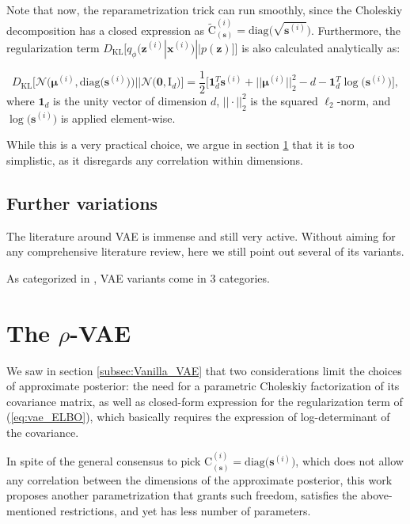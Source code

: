 \documentclass{article}
\begin{document}
Note that now, the reparametrization trick can run smoothly, since the Choleskiy decomposition has a closed expression as $\tilde{\mathrm{C}}_{(\mathbf{s})}^{(i)} = \text{diag} \big( \sqrt{\mathbf{s}^{(i)}} \big) $. Furthermore, the regularization term $D_{\text{KL}}\big[ q_{\phi}(\mathbf{z}^{(i)}  | \mathbf{x}^{(i)}) || p(\mathbf{z}) \big] \Big]$ is also calculated analytically as:

\begin{equation}  \label{eq:vae_KLD_loss}
D_{\text{KL}}\Big[ \mathcal{N} \Big( \boldsymbol{\mu}^{(i)}, \text{diag} \big( \mathbf{s}^{(i)} \big) \Big)    \Big|\Big|  \mathcal{N} \big( \mathbf{0}, \mathrm{I}_d \big)  \Big] = \frac{1}{2} \Big[ \mathbf{1}_d^T \mathbf{s}^{(i)} + \big|\big| \boldsymbol{\mu}^{(i)} \big|\big|_2^2 -d -  \mathbf{1}_d^T \log \big({\mathbf{s}^{(i)}} \big) \Big], 
\end{equation}
where $\mathbf{1}_d$ is the unity vector of dimension $d$, $||\cdot||_2^2$ is the squared $\ell_2$-norm, and $\log \big({\mathbf{s}^{(i)}} \big)$ is applied element-wise.

While this is a very practical choice, we argue in section \ref{sec:proposed} that it is too simplistic, as it disregards any correlation within dimensions.


\subsection{Further variations} \label{subsec:SOTA}
The literature around VAE is immense and still very active. Without aiming for any comprehensive literature review, here we still point out several of its variants.

As categorized in \cite{tschannen2018recent}, VAE variants come in 3 categories.
 
\section{The $\rho$-VAE}  \label{sec:proposed}
We saw in section \ref{subsec:Vanilla_VAE} that two considerations limit the choices of approximate posterior: the need for a parametric Choleskiy factorization of its covariance matrix, as well as closed-form expression for the regularization term of (\ref{eq:vae_ELBO}), which basically requires the expression of log-determinant  of the covariance.

In spite of the general consensus to pick $\mathrm{C}_{(\mathbf{s})}^{(i)} = \text{diag}\big( \mathbf{s}^{(i)} \big)$, which does not allow any correlation between the dimensions of the approximate posterior, this work proposes another parametrization that grants such freedom, satisfies the above-mentioned restrictions, and yet has less number of parameters.
\end{document}
